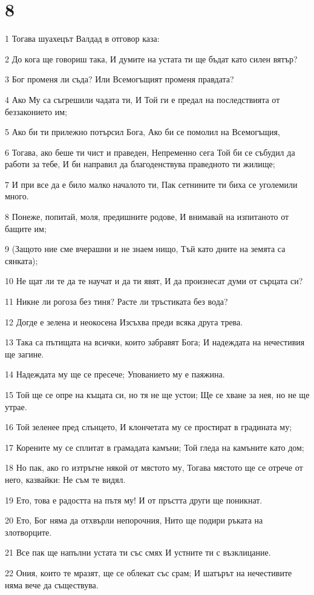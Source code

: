 \chapter{8}

\par 1 Тогава шуахецът Валдад в отговор каза:
\par 2 До кога ще говориш така, И думите на устата ти ще бъдат като силен вятър?
\par 3 Бог променя ли съда? Или Всемогъщият променя правдата?
\par 4 Ако Му са съгрешили чадата ти, И Той ги е предал на последствията от беззаконието им;
\par 5 Ако би ти прилежно потърсил Бога, Ако би се помолил на Всемогъщия,
\par 6 Тогава, ако беше ти чист и праведен, Непременно сега Той би се събудил да работи за тебе, И би направил да благоденствува праведното ти жилище;
\par 7 И при все да е било малко началото ти, Пак сетнините ти биха се уголемили много.
\par 8 Понеже, попитай, моля, предишните родове, И внимавай на изпитаното от бащите им;
\par 9 (Защото ние сме вчерашни и не знаем нищо, Тъй като дните на земята са сянката);
\par 10 Не щат ли те да те научат и да ти явят, И да произнесат думи от сърцата си?
\par 11 Никне ли рогоза без тиня? Расте ли тръстиката без вода?
\par 12 Догде е зелена и неокосена Изсъхва преди всяка друга трева.
\par 13 Така са пътищата на всички, които забравят Бога; И надеждата на нечестивия ще загине.
\par 14 Надеждата му ще се пресече; Упованието му е паяжина.
\par 15 Той ще се опре на къщата си, но тя не ще устои; Ще се хване за нея, но не ще утрае.
\par 16 Той зеленее пред слънцето, И клончетата му се простират в градината му;
\par 17 Корените му се сплитат в грамадата камъни; Той гледа на камъните като дом;
\par 18 Но пак, ако го изтръгне някой от мястото му, Тогава мястото ще се отрече от него, казвайки: Не съм те видял.
\par 19 Ето, това е радостта на пътя му! И от пръстта други ще поникнат.
\par 20 Ето, Бог няма да отхвърли непорочния, Нито ще подири ръката на злотворците.
\par 21 Все пак ще напълни устата ти със смях И устните ти с възклицание.
\par 22 Ония, които те мразят, ще се облекат със срам; И шатърът на нечестивите няма вече да съществува.

